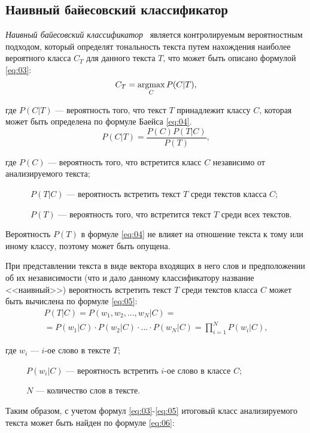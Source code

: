 \subsection{Наивный байесовский классификатор}

\textit{Наивный байесовский классификатор}~\cite{article21} является
контролируемым вероятностным подходом, который определят тональность текста
путем нахождения наиболее вероятного класса $C_T$ для данного текста $T$, что
может быть описано формулой \ref{eq:03}:
\begin{equation}\label{eq:03}
    C_T = \operatorname*{argmax}_C P(C|T),
\end{equation}

где $P(C|T)$ --- вероятность того, что текст $T$ принадлежит классу $C$,
которая может быть определена по формуле Баейса \ref{eq:04}.
\begin{equation}\label{eq:04}
    P(C|T) = \frac{P(C)P(T|C)}{P(T)},
\end{equation}

где $P(C)$ --- вероятность того, что встретится класс $C$ независимо от
анализируемого текста;

~~~~~~$P(T|C)$ --- вероятность встретить текст $T$ среди текстов класса $C$;

~~~~~~$P(T)$ --- вероятность того, что встретится текст $T$ среди всех текстов.

Вероятность $P(T)$ в формуле \ref{eq:04} не влияет на отношение текста к тому
или иному классу, поэтому может быть опущена.

При представлении текста в виде вектора входящих в него слов и предположении об
их независимости (что и дало данному классификатору название <<наивный>>)
вероятность встретить текст $T$ среди текстов класса $C$ может быть вычислена по
формуле \ref{eq:05}:
\begin{multline}\label{eq:05}
    P(T|C) = P(w_1, w_2, ..., w_N|C) = \\ =P(w_1|C) \cdot P(w_2|C) \cdot ...
    \cdot P(w_N|C) = \prod\limits_{i=1}^{N} P(w_i|C),
\end{multline}

где $w_i$ --- $i$-ое слово в тексте $T$;

~~~~~$P(w_i|C)$ --- вероятность встретить $i$-ое слово в классе $C$;

~~~~~$N$ --- количество слов в тексте.

Таким образом, с учетом формул \ref{eq:03}-\ref{eq:05} итоговый класс
анализируемого текста может быть найден по формуле \ref{eq:06}:


